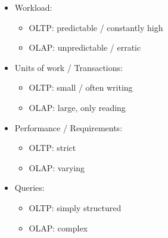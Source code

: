 \begin{breakbox}
\begin{itemize}
	\item Workload:
	\begin{itemize}
		\item OLTP: predictable / constantly high
		\item OLAP: unpredictable / erratic
	\end{itemize}
	\item Units of work / Transactions:
	\begin{itemize}
		\item OLTP: small / often writing
		\item OLAP: large, only reading
	\end{itemize}
	\item Performance / Requirements:
	\begin{itemize}
		\item OLTP: strict
		\item OLAP: varying
	\end{itemize}
	\item Queries:
	\begin{itemize}
		\item OLTP: simply structured
		\item OLAP: complex
	\end{itemize}
\end{itemize}
\end{breakbox}
